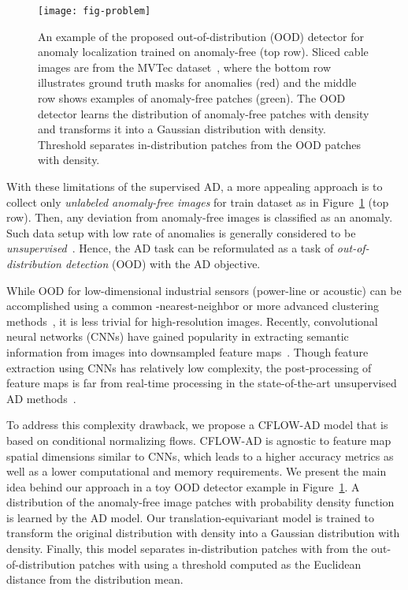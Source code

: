 \documentclass[10pt,twocolumn,letterpaper]{article}
\begin{document}
\begin{figure}[t]
	\centering
	\texttt{[image: fig-problem]}
	\caption{An example of the proposed out-of-distribution (OOD) detector for anomaly localization trained on anomaly-free  (top row). Sliced cable images are from the MVTec dataset~\cite{Bergmann_2019_CVPR}, where the bottom row illustrates  ground truth masks for anomalies (red) and the middle row shows examples of anomaly-free patches (green). The OOD detector learns the distribution of anomaly-free patches  with  density and transforms it into a Gaussian distribution with  density. Threshold  separates in-distribution patches from the OOD patches with  density.}
	\label{fig:problem}
\end{figure}

With these limitations of the supervised AD, a more appealing approach is to collect only \textit{unlabeled anomaly-free images} for train dataset  as in Figure~\ref{fig:problem} (top row). Then, any deviation from anomaly-free images is classified as an anomaly. Such data setup with low rate of anomalies is generally considered to be \textit{unsupervised}~\cite{Bergmann_2019_CVPR}. Hence, the AD task can be reformulated as a task of \textit{out-of-distribution detection} (OOD) with the AD objective.

While OOD for low-dimensional industrial sensors (\eg power-line or acoustic) can be accomplished using a common -nearest-neighbor or more advanced clustering methods~\cite{knn-ad}, it is less trivial for high-resolution images. Recently, convolutional neural networks (CNNs) have gained popularity in extracting semantic information from images into downsampled feature maps~\cite{Bergmann_2019_CVPR}. Though feature extraction using CNNs has relatively low complexity, the post-processing of feature maps is far from real-time processing in the state-of-the-art unsupervised AD methods~\cite{defard2020padim}.

To address this complexity drawback, we propose a CFLOW-AD model that is based on conditional normalizing flows. CFLOW-AD is agnostic to feature map spatial dimensions similar to CNNs, which leads to a higher accuracy metrics as well as a lower computational and memory requirements. We present the main idea behind our approach in a toy OOD detector example in Figure~\ref{fig:problem}. A distribution of the anomaly-free image patches  with probability density function  is learned by the AD model. Our translation-equivariant model is trained to transform the original distribution with  density into a Gaussian distribution with  density. Finally, this model separates in-distribution patches  with  from the out-of-distribution patches with  using a threshold  computed as the Euclidean distance from the distribution mean.
\end{document}
